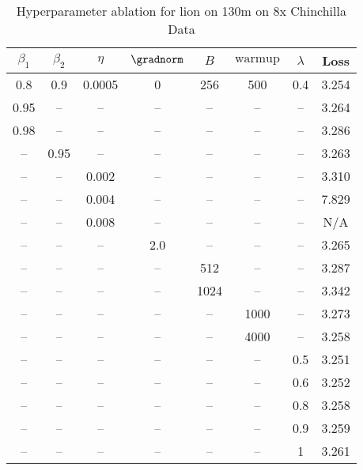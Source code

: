 \begin{table}[h!]
\centering
\caption{Hyperparameter ablation for lion on 130m on 8x Chinchilla Data}
\label{tab:ablation_lion_130m_on_8x_chinchilla_data}
\begin{tabular}{cccccccc}
\toprule
$\beta_1$ & $\beta_2$ & $\eta$ & $\gradnorm$ & $B$ & $\mathrm{warmup}$ & $\lambda$ & Loss \\
\midrule
0.8 & 0.9 & 0.0005 & 0 & 256 & 500 & 0.4 & 3.254 \\
\midrule
0.95 & -- & -- & -- & -- & -- & -- & 3.264 \\
0.98 & -- & -- & -- & -- & -- & -- & 3.286 \\
-- & 0.95 & -- & -- & -- & -- & -- & 3.263 \\
-- & -- & 0.002 & -- & -- & -- & -- & 3.310 \\
-- & -- & 0.004 & -- & -- & -- & -- & 7.829 \\
-- & -- & 0.008 & -- & -- & -- & -- & N/A \\
-- & -- & -- & 2.0 & -- & -- & -- & 3.265 \\
-- & -- & -- & -- & 512 & -- & -- & 3.287 \\
-- & -- & -- & -- & 1024 & -- & -- & 3.342 \\
-- & -- & -- & -- & -- & 1000 & -- & 3.273 \\
-- & -- & -- & -- & -- & 4000 & -- & 3.258 \\
-- & -- & -- & -- & -- & -- & 0.5 & 3.251 \\
-- & -- & -- & -- & -- & -- & 0.6 & 3.252 \\
-- & -- & -- & -- & -- & -- & 0.8 & 3.258 \\
-- & -- & -- & -- & -- & -- & 0.9 & 3.259 \\
-- & -- & -- & -- & -- & -- & 1 & 3.261 \\
\bottomrule
\end{tabular}
\end{table}

